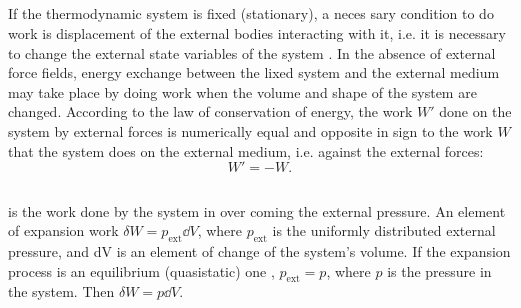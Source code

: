 \subsection{}\label{9.2.2} If the thermodynamic system is fixed (stationary), a neces­ sary condition to do work is displacement of the external bodies interacting with it, i.e. it is necessary to change the external state variables of the system . In the absence of external force fields, energy exchange between the lixed system and the external medium may take place by doing work when the volume and shape of the system are changed. According to the law of conservation of energy, the work $W'$ done on the system by external forces is numerically equal and opposite in sign to the work $W$ that the system does on the external medium, i.e. against the external forces:
\begin{equation*}%
W' = -W.
\end{equation*}
\subsection{}\label{9.2.3}  is the work done by the system in over­ coming the external pressure. An element of expansion work $\delta W = p_{\textrm{ext}} \dd V$, where $p_{\textrm{ext}}$ is the uniformly distributed external pressure, and dV is an element of change of the system's volume. If the expansion process is an equilibrium (quasistatic) one , $p_{\textrm{ext}} = p$, where $p$ is the pressure in the system. Then $\delta W = p \dd V$.

